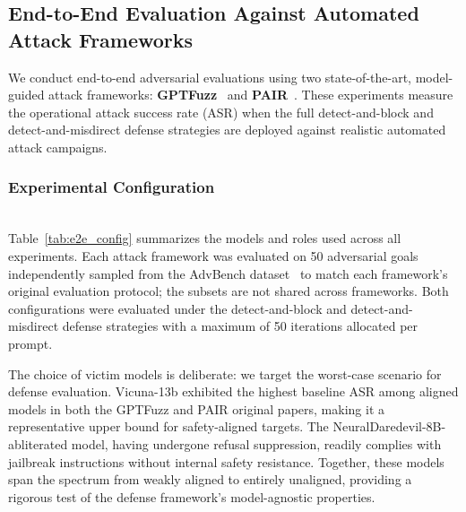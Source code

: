 \subsection{End-to-End Evaluation Against Automated Attack Frameworks}
\label{sec:e2e_eval}

We conduct end-to-end adversarial evaluations using two state-of-the-art, model-guided attack frameworks: \textbf{GPTFuzz}~\cite{yu2023gptfuzzer,llmfuzzer2024} and \textbf{PAIR}~\cite{pair2023}. These experiments measure the operational attack success rate (ASR) when the full detect-and-block and detect-and-misdirect defense strategies are deployed against realistic automated attack campaigns.

\subsubsection{Experimental Configuration}

\mbox{}\\[8pt]
Table~\ref{tab:e2e_config} summarizes the models and roles used across all experiments. Each attack framework was evaluated on 50 adversarial goals independently sampled from the AdvBench dataset~\cite{gcg2023} to match each framework's original evaluation protocol; the subsets are not shared across frameworks. Both configurations were evaluated under the detect-and-block and detect-and-misdirect defense strategies with a maximum of 50 iterations allocated per prompt.

The choice of victim models is deliberate: we target the worst-case scenario for defense evaluation. Vicuna-13b exhibited the highest baseline ASR among aligned models in both the GPTFuzz and PAIR original papers, making it a representative upper bound for safety-aligned targets. The NeuralDaredevil-8B-abliterated model, having undergone refusal suppression, readily complies with jailbreak instructions without internal safety resistance. Together, these models span the spectrum from weakly aligned to entirely unaligned, providing a rigorous test of the defense framework's model-agnostic properties.

